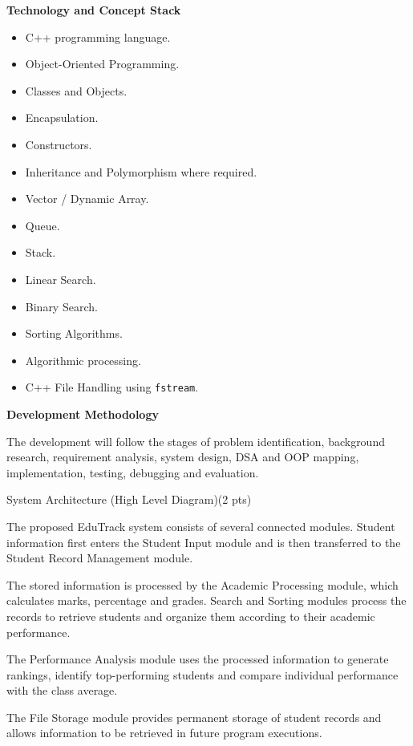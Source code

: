 \documentclass[11pt,a4paper]{article}
\newcommand{\blueheading}[1]{%
  {\sffamily\color{TitleBlue}\fontsize{15}{18}\selectfont #1}%
}
\begin{document}
\begin{answerbox}
\textbf{Technology and Concept Stack}
\begin{itemize}[leftmargin=7mm,itemsep=1.5pt,topsep=2pt,parsep=0pt]
\item C++ programming language.
\item Object-Oriented Programming.
\item Classes and Objects.
\item Encapsulation.
\item Constructors.
\item Inheritance and Polymorphism where required.
\item Vector / Dynamic Array.
\item Queue.
\item Stack.
\item Linear Search.
\item Binary Search.
\item Sorting Algorithms.
\item Algorithmic processing.
\item C++ File Handling using \texttt{fstream}.
\end{itemize}

\textbf{Development Methodology}

The development will follow the stages of problem identification, background research, requirement analysis, system design, DSA and OOP mapping, implementation, testing, debugging and evaluation.
\end{answerbox}

\newpage

\blueheading{System Architecture (High Level Diagram)(2 pts)}

\vspace{10mm}
\begin{answerbox}
The proposed EduTrack system consists of several connected modules. Student information first enters the Student Input module and is then transferred to the Student Record Management module.

The stored information is processed by the Academic Processing module, which calculates marks, percentage and grades. Search and Sorting modules process the records to retrieve students and organize them according to their academic performance.

The Performance Analysis module uses the processed information to generate rankings, identify top-performing students and compare individual performance with the class average.

The File Storage module provides permanent storage of student records and allows information to be retrieved in future program executions.
\end{answerbox}
\end{document}
